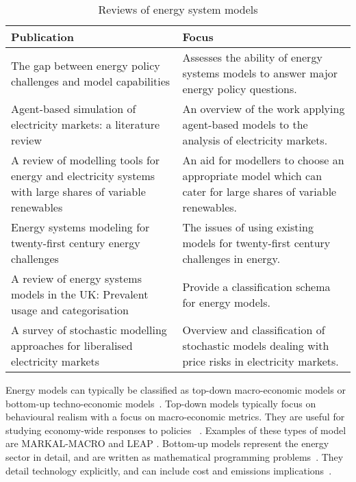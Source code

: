 \begin{table}[]
	\footnotesize
	\caption{Reviews of energy system models}
	\label{tab:litreview:reviews}
	\begin{tabular}{p{7.5cm}p{7.5cm}}
		\toprule
		Publication                                                                                                                 & Focus                                                                                                        \\ \midrule
		The gap between energy policy challenges and model capabilities \cite{Savvidis2019a}                                        & Assesses the ability of energy systems models to answer major energy policy questions.                       \\
		Agent-based simulation of electricity markets: a literature review \cite{Sensfub2007}                                       & An overview of the work applying agent-based models to the analysis of electricity markets.                  \\
		A review of modelling tools for energy and electricity systems with large shares of variable renewables \cite{Ringkjob2018} & An aid for modellers to choose an appropriate model which can cater for large shares of variable renewables. \\
		Energy systems modeling for twenty-first century energy challenges \cite{Pfenninger2014b}                                   & The issues of using existing models for twenty-first century challenges in energy.                           \\
		A review of energy systems models in the UK: Prevalent usage and categorisation \cite{Hall2016a}                            & Provide a classification schema for energy models.                                                           \\
		A survey of stochastic modelling approaches for liberalised electricity markets \cite{Most2010}                             & Overview and classification of stochastic models dealing with price risks in electricity markets.            \\ \bottomrule
	\end{tabular}
\end{table}



Energy models can typically be classified as top-down macro-economic models or bottom-up techno-economic models~\cite{Bohringer1998}. Top-down models typically focus on behavioural realism with a focus on macro-economic metrics. They are useful for studying economy-wide responses to policies ~\cite{Hall2016}. Examples of these types of model are MARKAL-MACRO \cite{Fishbone1981} and LEAP \cite{Heaps2016}. Bottom-up models represent the energy sector in detail, and are written as mathematical programming problems~\cite{Gargiulo2013}. They detail technology explicitly, and can include cost and emissions implications~\cite{Hall2016}.

